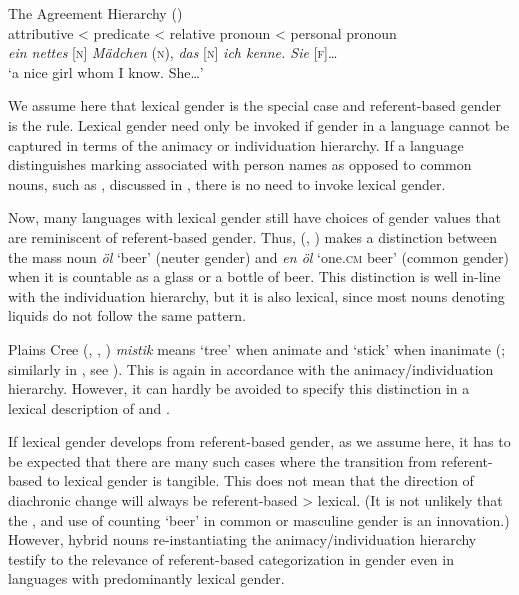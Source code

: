 \documentclass[output=collectionpaper]{langsci/langscibook}
\begin{document}
\ea\label{ex:WDG:15}
The Agreement Hierarchy (\citealt[226]{Corbett1991})\\
attributive < predicate < relative pronoun < personal pronoun\\
\textit{ein nettes} [\textsc{n}] \textit{Mädchen} (\textsc{n}), \textit{das} [\textsc{n}] \textit{ich kenne. Sie} [\textsc{f}]{\dots}\\
`a nice girl whom I know. She{\dots}'\\
\z

We assume here that lexical gender is the special case and referent-based gender is the rule. Lexical gender need only be invoked if gender in a language cannot be captured in terms of the animacy or individuation hierarchy. If a language distinguishes marking associated with person names as opposed to common nouns, such as , discussed in , there is no need to invoke lexical gender.

Now, many languages with lexical gender still have choices of gender values that are reminiscent of referent-based gender. Thus,  (, ) makes a distinction between the mass noun \textit{öl} `beer' (neuter gender) and \textit{en öl} `one.\textsc{cm} beer' (common gender) when it is countable as a glass or a bottle of beer. This distinction is well in-line with the individuation hierarchy, but it is also lexical, since most  nouns denoting liquids do not follow the same pattern.

Plains Cree (, , ) \textit{mistik} means `tree' when animate and `stick' when inanimate (\citealt[22]{Wolfart1973}; similarly in , see \citealt[128]{Straus1982}). This is again in accordance with the animacy/individuation hierarchy. However, it can hardly be avoided to specify this distinction in a lexical description of  and .

If lexical gender develops from referent-based gender, as we assume here, it has to be expected that there are many such cases where the transition from referent-based to lexical gender is tangible. This does not mean that the direction of diachronic change will always be referent-based > lexical. (It is not unlikely that the ,  and  use of counting `beer' in common \textendash{} or masculine \textendash{} gender is an innovation.) However, hybrid nouns re-instantiating the animacy/individuation hierarchy testify to the relevance of referent-based categorization in gender even in languages with predominantly lexical gender.
\end{document}
